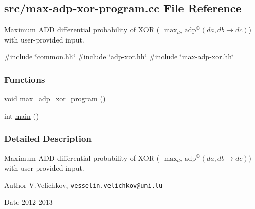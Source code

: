 \hypertarget{max-adp-xor-program_8cc}{\subsection{src/max-\/adp-\/xor-\/program.cc \-File \-Reference}
\label{max-adp-xor-program_8cc}
}


\-Maximum \-A\-D\-D differential probability of \-X\-O\-R ( $\max_{dc} \mathrm{adp}^{\oplus}(da, db \rightarrow dc)$) with user-\/provided input.  


{\ttfamily \#include \char`\"{}common.\-hh\char`\"{}}\*
{\ttfamily \#include \char`\"{}adp-\/xor.\-hh\char`\"{}}\*
{\ttfamily \#include \char`\"{}max-\/adp-\/xor.\-hh\char`\"{}}\*
\subsubsection*{\-Functions}
\begin{DoxyCompactItemize}
\item 
void \hyperlink{max-adp-xor-program_8cc_a6a0403e03bb9e1674362647c9333a6f4}{max\-\_\-adp\-\_\-xor\-\_\-program} ()
\item 
int \hyperlink{max-adp-xor-program_8cc_ae66f6b31b5ad750f1fe042a706a4e3d4}{main} ()
\end{DoxyCompactItemize}


\subsubsection{\-Detailed \-Description}
\-Maximum \-A\-D\-D differential probability of \-X\-O\-R ( $\max_{dc} \mathrm{adp}^{\oplus}(da, db \rightarrow dc)$) with user-\/provided input. \begin{DoxyAuthor}{\-Author}
\-V.\-Velichkov, \href{mailto:vesselin.velichkov@uni.lu}{\tt vesselin.\-velichkov@uni.\-lu} 
\end{DoxyAuthor}
\begin{DoxyDate}{\-Date}
2012-\/2013 
\end{DoxyDate}


